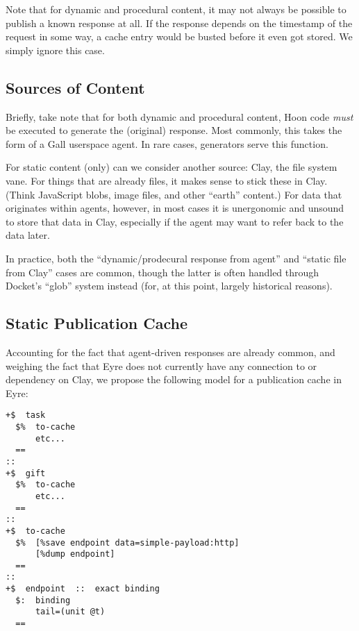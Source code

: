 \documentclass[twoside]{article}
\begin{document}
Note that for dynamic and procedural content, it may not always be possible to publish a known response at all. If the response depends on the timestamp of the request in some way, a cache entry would be busted before it even got stored. We simply ignore this case.

\subsection{Sources of Content}

Briefly, take note that for both dynamic and procedural content, Hoon code \emph{must} be executed to generate the (original) response. Most commonly, this takes the form of a Gall userspace agent. In rare cases, generators serve this function.

For static content (only) can we consider another source: Clay, the file system vane. For things that are already files, it makes sense to stick these in Clay. (Think JavaScript blobs, image files, and other ``earth'' content.)  For data that originates within agents, however, in most cases it is unergonomic and unsound to store that data in Clay, especially if the agent may want to refer back to the data later.

In practice, both the ``dynamic/prodecural response from agent'' and ``static file from Clay'' cases are common, though the latter is often handled through Docket's ``glob'' system instead (for, at this point, largely historical reasons).

\subsection{Static Publication Cache}

Accounting for the fact that agent-driven responses are already common, and weighing the fact that Eyre does not currently have any connection to or dependency on Clay, we propose the following model for a publication cache in Eyre:

\begin{lstlisting}[style=listingcode]
+$  task
  $%  to-cache
      etc...
  ==
::
+$  gift
  $%  to-cache
      etc...
  ==
::
+$  to-cache
  $%  [%save endpoint data=simple-payload:http]
      [%dump endpoint]
  ==
::
+$  endpoint  ::  exact binding
  $:  binding
      tail=(unit @t)
  ==
\end{lstlisting}
\end{document}
